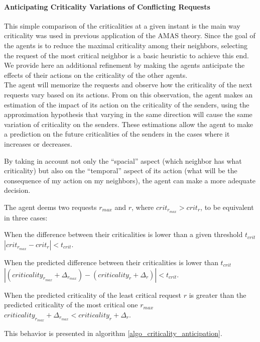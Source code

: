 \paragraph*{Anticipating Criticality Variations of Conflicting Requests}

This simple comparison of the criticalities at a given instant is the main way criticality was used in previous application of the AMAS theory. Since the goal of the agents is to reduce the maximal criticality among their neighbors, selecting the request of the most critical neighbor is a basic heuristic to achieve this end. We provide here an additional refinement by making the agents anticipate the effects of their actions on the criticality of the other agents.\\
The agent will memorize the requests and observe how the criticality of the next requests vary based on its actions. From on this observation, the agent makes an estimation of the impact of its action on the criticality of the senders, using the approximation hypothesis that varying in the same direction will cause the same variation of criticality on the senders. These estimations allow the agent to make a prediction on the future criticalities of the senders in the cases where it increases or decreases.

By taking in account not only the \enquote{spacial} aspect (which neighbor has what criticality) but also on the \enquote{temporal} aspect of its action (what will be the consequence of my action on my neighbors), the agent can make a more adequate decision.

The agent deems two requests $r_{max}$ and $r$, where $crit_{r_{max}} > crit_{r}$, to be equivalent in three cases:
\begin{compactitem}
\item When the difference between their criticalities is lower than a given threshold $t_{crit}$\\$|crit_{r_{max}} - crit_{r}|< t_{crit}$.
\item When the predicted difference between their criticalities is lower than $t_{crit}$\\$|(criticality_{r_{max}} + \Delta_{r_{max}}) - (criticality_{r} + \Delta_r)| < t_{crit}$.
\item When the predicted criticality of the least critical request $r$ is greater than the predicted criticality of the most critical one $r_{max}$\\$criticality_{r_{max}} + \Delta_{r_{max}} < criticality_{r}+ \Delta_r$.
\end{compactitem}
This behavior is presented in algorithm \ref{algo_criticality_anticipation}.

